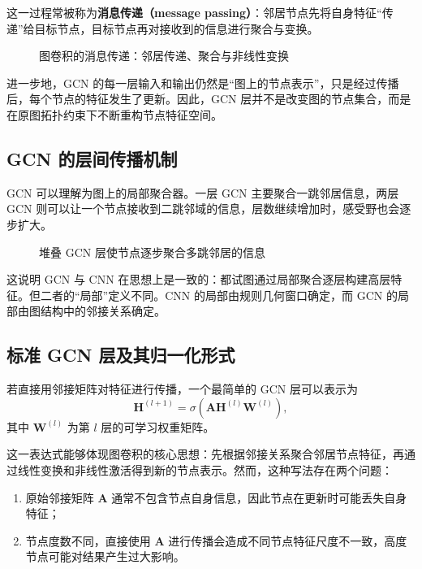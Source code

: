 这一过程常被称为\textbf{消息传递（message passing）}：邻居节点先将自身特征“传递”给目标节点，目标节点再对接收到的信息进行聚合与变换。

\begin{figure}[H]
  \centering
  \resizebox{0.95\textwidth}{!}{}
  \caption{图卷积的消息传递：邻居传递、聚合与非线性变换}
  \label{fig:ch09_orig20}
\end{figure}

进一步地，GCN 的每一层输入和输出仍然是“图上的节点表示”，只是经过传播后，每个节点的特征发生了更新。因此，GCN 层并不是改变图的节点集合，而是在原图拓扑约束下不断重构节点特征空间。

\subsection{GCN 的层间传播机制}

GCN 可以理解为图上的局部聚合器。一层 GCN 主要聚合一跳邻居信息，两层 GCN 则可以让一个节点接收到二跳邻域的信息，层数继续增加时，感受野也会逐步扩大。

\begin{figure}[H]
  \centering
  
  \caption{堆叠 GCN 层使节点逐步聚合多跳邻居的信息}
  \label{fig:ch09_orig21}
\end{figure}

这说明 GCN 与 CNN 在思想上是一致的：都试图通过局部聚合逐层构建高层特征。但二者的“局部”定义不同。CNN 的局部由规则几何窗口确定，而 GCN 的局部由图结构中的邻接关系确定。

\subsection{标准 GCN 层及其归一化形式}

若直接用邻接矩阵对特征进行传播，一个最简单的 GCN 层可以表示为
\begin{equation}
    \mathbf{H}^{(l+1)}
    =
    \sigma\!\left(
    \mathbf{A}\mathbf{H}^{(l)}\mathbf{W}^{(l)}
    \right),
\end{equation}
其中 $\mathbf{W}^{(l)}$ 为第 $l$ 层的可学习权重矩阵。

这一表达式能够体现图卷积的核心思想：先根据邻接关系聚合邻居节点特征，再通过线性变换和非线性激活得到新的节点表示。然而，这种写法存在两个问题：

\begin{enumerate}
    \item 原始邻接矩阵 $\mathbf{A}$ 通常不包含节点自身信息，因此节点在更新时可能丢失自身特征；
    \item 节点度数不同，直接使用 $\mathbf{A}$ 进行传播会造成不同节点特征尺度不一致，高度节点可能对结果产生过大影响。
\end{enumerate}

